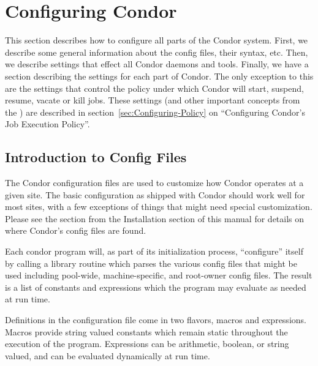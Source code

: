 \section{Configuring Condor}
\label{sec:Configuring-Condor}

This section describes how to configure all parts of the Condor
system.  First, we describe some general information about the config
files, their syntax, etc.  Then, we describe settings that effect all
Condor daemons and tools.  Finally, we have a section describing the
settings for each part of Condor.  The only exception to this are the
settings that control the policy under which Condor will start,
suspend, resume, vacate or kill jobs.  These settings (and other
important concepts from the ) are described in 
section~\ref{sec:Configuring-Policy} on ``Configuring Condor's Job
Execution Policy''. 

\subsection{Introduction to Config Files}
\label{sec:Intro-to-Config-Files}

The Condor configuration files are used to customize how Condor
operates at a given site.  The basic configuration as shipped with
Condor should work well for most sites, with a few exceptions of
things that might need special customization.  Please see the section
from the Installation section of this manual for details on where
Condor's config files are found.

Each condor program will, as part of its initialization process,
``configure'' itself by calling a library routine which parses the
various config files that might be used including pool-wide,
machine-specific, and root-owner config files.  The result is a list
of constants and expressions which the program may evaluate as needed
at run time.

Definitions in the configuration file come in two flavors, macros and
expressions.  Macros provide string valued constants which remain
static throughout the execution of the program.  Expressions can be
arithmetic, boolean, or string valued, and can be evaluated
dynamically at run time.


